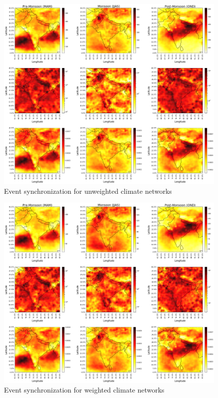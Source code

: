 \begin{figure}[h]
  \centering
  \includegraphics[width=\linewidth]{./99_appendix/img/event_sync_0-75_0-9.png}
  \caption{Event synchronization for unweighted climate networks}
  \label{apx:trmm_prec}
\end{figure}

\begin{figure}[h]
  \centering
  \includegraphics[width=\linewidth]{./99_appendix/img/event_sync_0-75_0-9_weighted.png}
  \caption{Event synchronization for weighted climate networks}
  \label{apx:trmm_prec}
\end{figure}

